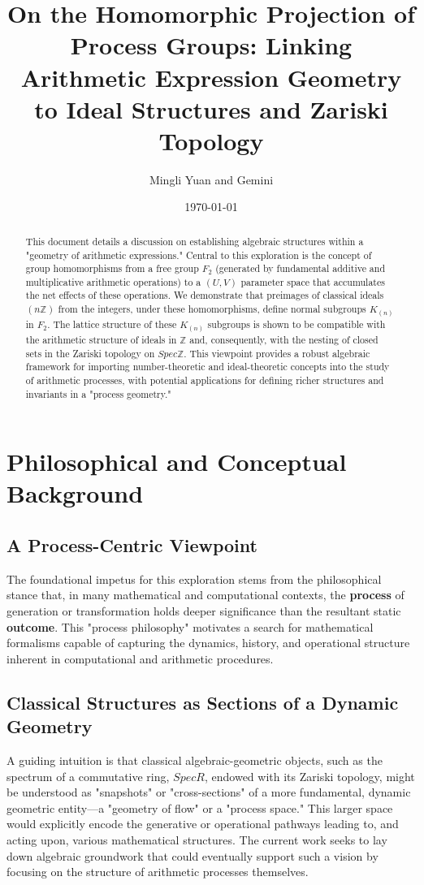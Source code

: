 \documentclass{article}[a4paper,12pt]
\title{On the Homomorphic Projection of Process Groups: Linking Arithmetic Expression Geometry to Ideal Structures and Zariski Topology}
\author{Mingli Yuan and Gemini}
\date{\today} %
\begin{document}
\maketitle
\begin{abstract}
This document details a discussion on establishing algebraic structures within a "geometry of arithmetic expressions." Central to this exploration is the concept of group homomorphisms from a free group $F_2$ (generated by fundamental additive and multiplicative arithmetic operations) to a $(U,V)$ parameter space that accumulates the net effects of these operations. We demonstrate that preimages of classical ideals $(n\mathbb{Z})$ from the integers, under these homomorphisms, define normal subgroups $K_{(n)}$ in $F_2$. The lattice structure of these $K_{(n)}$ subgroups is shown to be compatible with the arithmetic structure of ideals in $\mathbb{Z}$ and, consequently, with the nesting of closed sets in the Zariski topology on $Spec \mathbb{Z}$. This viewpoint provides a robust algebraic framework for importing number-theoretic and ideal-theoretic concepts into the study of arithmetic processes, with potential applications for defining richer structures and invariants in a "process geometry."
\end{abstract}

\tableofcontents
\newpage

\section{Philosophical and Conceptual Background}
\label{sec:background}

\subsection{A Process-Centric Viewpoint}
The foundational impetus for this exploration stems from the philosophical stance that, in many mathematical and computational contexts, the \textbf{process} of generation or transformation holds deeper significance than the resultant static \textbf{outcome}. This "process philosophy" motivates a search for mathematical formalisms capable of capturing the dynamics, history, and operational structure inherent in computational and arithmetic procedures.

\subsection{Classical Structures as Sections of a Dynamic Geometry}
A guiding intuition is that classical algebraic-geometric objects, such as the spectrum of a commutative ring, $Spec R$, endowed with its Zariski topology, might be understood as "snapshots" or "cross-sections" of a more fundamental, dynamic geometric entity—a "geometry of flow" or a "process space." This larger space would explicitly encode the generative or operational pathways leading to, and acting upon, various mathematical structures. The current work seeks to lay down algebraic groundwork that could eventually support such a vision by focusing on the structure of arithmetic processes themselves.
\end{document}
